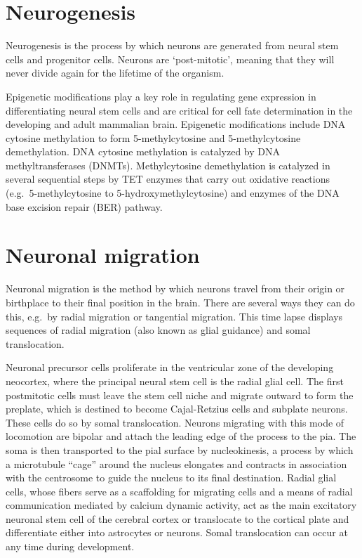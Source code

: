 \documentclass[]{book}
\begin{document}
\hypertarget{neurogenesis}{%
\section{Neurogenesis}\label{neurogenesis}}

Neurogenesis is the process by which neurons are generated from neural stem cells and progenitor cells. Neurons are `post-mitotic', meaning that they will never divide again for the lifetime of the organism.

Epigenetic modifications play a key role in regulating gene expression in differentiating neural stem cells and are critical for cell fate determination in the developing and adult mammalian brain. Epigenetic modifications include DNA cytosine methylation to form 5-methylcytosine and 5-methylcytosine demethylation. DNA cytosine methylation is catalyzed by DNA methyltransferases (DNMTs). Methylcytosine demethylation is catalyzed in several sequential steps by TET enzymes that carry out oxidative reactions (e.g.~5-methylcytosine to 5-hydroxymethylcytosine) and enzymes of the DNA base excision repair (BER) pathway.

\hypertarget{neuronal-migration}{%
\section{Neuronal migration}\label{neuronal-migration}}

Neuronal migration is the method by which neurons travel from their origin or birthplace to their final position in the brain. There are several ways they can do this, e.g.~by radial migration or tangential migration. This time lapse displays sequences of radial migration (also known as glial guidance) and somal translocation.

Neuronal precursor cells proliferate in the ventricular zone of the developing neocortex, where the principal neural stem cell is the radial glial cell. The first postmitotic cells must leave the stem cell niche and migrate outward to form the preplate, which is destined to become Cajal-Retzius cells and subplate neurons. These cells do so by somal translocation. Neurons migrating with this mode of locomotion are bipolar and attach the leading edge of the process to the pia. The soma is then transported to the pial surface by nucleokinesis, a process by which a microtubule ``cage'' around the nucleus elongates and contracts in association with the centrosome to guide the nucleus to its final destination. Radial glial cells, whose fibers serve as a scaffolding for migrating cells and a means of radial communication mediated by calcium dynamic activity, act as the main excitatory neuronal stem cell of the cerebral cortex or translocate to the cortical plate and differentiate either into astrocytes or neurons. Somal translocation can occur at any time during development.
\end{document}
